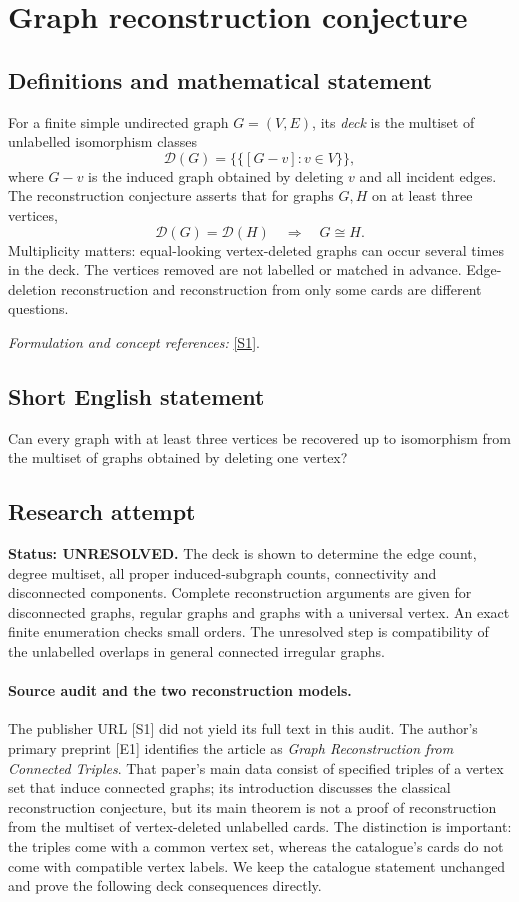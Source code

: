 \documentclass[11pt]{article}
\begin{document}
\section*{\texorpdfstring{Graph reconstruction conjecture}{Graph reconstruction conjecture}}\label{335}
\subsection{Definitions and mathematical statement}
For a finite simple undirected graph $G=(V,E)$, its \emph{deck} is the multiset of unlabelled isomorphism classes
\[
 \mathcal D(G)=\bigl\{\!\bigl\{[G-v]:v\in V\bigr\}\!\bigr\},
\]
where $G-v$ is the induced graph obtained by deleting $v$ and all incident edges. The reconstruction conjecture asserts that for graphs $G,H$ on at least three vertices,
\[
 \mathcal D(G)=\mathcal D(H)\quad\Longrightarrow\quad G\cong H.
\]
Multiplicity matters: equal-looking vertex-deleted graphs can occur several times in the deck. The vertices removed are not labelled or matched in advance. Edge-deletion reconstruction and reconstruction from only some cards are different questions.
\par\smallskip\textit{Formulation and concept references:} \href{https://www.sciencedirect.com/science/article/abs/pii/S0012365X26000828}{[S1]}.

\subsection{Short English statement}
Can every graph with at least three vertices be recovered up to isomorphism from the multiset of graphs obtained by deleting one vertex?
\subsection{Research attempt}
\textbf{Status: UNRESOLVED.} The deck is shown to determine the edge count, degree multiset, all proper induced-subgraph counts, connectivity and disconnected components. Complete reconstruction arguments are given for disconnected graphs, regular graphs and graphs with a universal vertex. An exact finite enumeration checks small orders. The unresolved step is compatibility of the unlabelled overlaps in general connected irregular graphs.

\paragraph{Source audit and the two reconstruction models.}
The publisher URL [S1] did not yield its full text in this audit. The author's primary preprint [E1] identifies the article as \emph{Graph Reconstruction from Connected Triples}. That paper's main data consist of specified triples of a vertex set that induce connected graphs; its introduction discusses the classical reconstruction conjecture, but its main theorem is not a proof of reconstruction from the multiset of vertex-deleted unlabelled cards. The distinction is important: the triples come with a common vertex set, whereas the catalogue's cards do not come with compatible vertex labels. We keep the catalogue statement unchanged and prove the following deck consequences directly.
\end{document}
